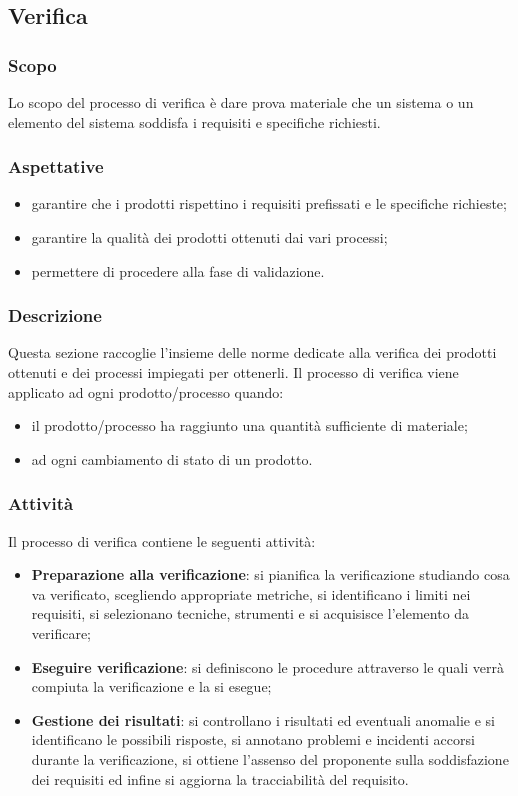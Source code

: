 	\subsection{Verifica}
	\subsubsection{Scopo}
	Lo scopo del processo di verifica è dare prova materiale che un sistema o un elemento del sistema soddisfa i requisiti e specifiche richiesti.
	
	\subsubsection{Aspettative}
	\begin{itemize}
		\item garantire che i prodotti rispettino i requisiti prefissati e le specifiche richieste;
		\item garantire la qualità dei prodotti ottenuti dai vari processi;
		\item permettere di procedere alla fase di validazione.
	\end{itemize}

	\subsubsection{Descrizione}
	Questa sezione raccoglie l'insieme delle norme dedicate alla verifica dei prodotti ottenuti e dei processi impiegati per ottenerli. Il processo di verifica viene applicato ad ogni prodotto/processo quando:
	\begin{itemize}
		\item il prodotto/processo ha raggiunto una quantità sufficiente di materiale;
		\item ad ogni cambiamento di stato di un prodotto.
	\end{itemize}
	
	 
	\subsubsection{Attività}
	Il processo di verifica contiene le seguenti attività:
	\begin{itemize}
	    \item \textbf{Preparazione alla verificazione}: si pianifica la verificazione studiando cosa va verificato, scegliendo appropriate metriche, si identificano i limiti nei requisiti, si selezionano tecniche, strumenti e si acquisisce l'elemento da verificare;
	    \item \textbf{Eseguire verificazione}: si definiscono le procedure attraverso le quali verrà compiuta la verificazione e la si esegue;
	    \item \textbf{Gestione dei risultati}: si controllano i risultati ed eventuali anomalie e si identificano le possibili risposte, si annotano problemi e incidenti accorsi durante la verificazione, si ottiene l'assenso del proponente sulla soddisfazione dei requisiti ed infine si aggiorna la tracciabilità del requisito.
	\end{itemize}
